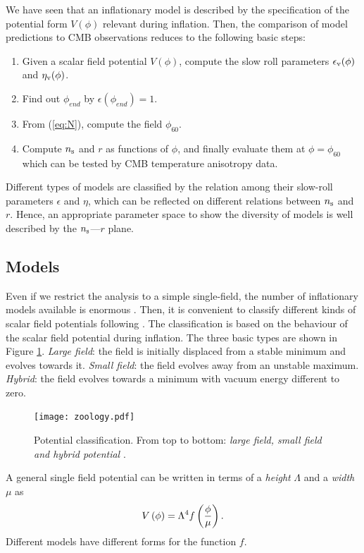 \documentclass{rmaa}
\begin{document}
We have seen that an inflationary model is described by the specification of the 
potential form $V(\phi)$ relevant during inflation. Then, the comparison of  
model predictions to CMB observations reduces to the following basic steps:
\begin{enumerate}
 \item Given a scalar field potential $V(\phi)$, compute the slow roll parameters $\epsilon_{\rm v}(\phi)$ and
$\eta_{\rm v}(\phi)$. 
\item Find out $\phi_{end}$ by $\epsilon(\phi_{end})=1$. 
\item From (\ref{eq:N}), compute the field $\phi_{60}$.
\item  Compute $n_{\rm s}$ and $r$ as functions of $\phi$, and finally evaluate them at $\phi =
\phi_{60}$ which can be tested by CMB temperature anisotropy data. 
\end{enumerate}


Different types of models are classified by the relation among their slow-roll 
parameters $\epsilon$ and $\eta$, which can be reflected on different relations
 between $n_{\rm s}$ and $r$. Hence, an appropriate parameter space to show the diversity of models 
 is well described by the $n_{\rm s}$---$r$ plane.  



\subsection{Models}


Even if we restrict the analysis to a simple single-field, the number of inflationary models
available is enormous \citep{LiddleLyth, Lyth, Linde05}. Then, it is convenient to classify
different kinds of scalar field potentials following \citep{Kinney2}. 
%
The classification is based on the behaviour of the scalar field potential during inflation.
The three basic types are shown in Figure \ref{fig:models}.
{\em Large field}: the field is initially displaced from a stable minimum and evolves 
towards it. {\em Small field}: the field evolves away from an unstable maximum. 
{\em Hybrid}: the field evolves towards a minimum with vacuum energy different to zero. 


\begin{figure}[ht] 
  \texttt{[image: zoology.pdf]}
\caption{Potential classification. From top to bottom:
\textit{large field, small field and hybrid potential} \citep{Kinney2}.}
\label{fig:models}
\end{figure}
%
A general single field potential can be written in terms of a \textit{height} $\Lambda$ and a 
\textit{width} $\mu$ as
%
\begin{equation}
V\left(\phi\right) = \Lambda^4 f\left({\phi \over \mu}\right).
\end{equation}
%
Different models have different forms for the function $f$.
\end{document}
